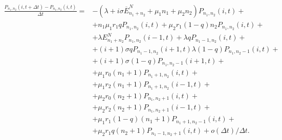 \begin{equation*}
	\begin{split}
\frac{P_{n_{1}, n_{2}}(i,t+\Delta t) - P_{n_{1}, n_{2}}(i, t)}{\Delta t}=&-(\lambda+i\sigma \overline{E}_{n_{1}+n_{2}}^N+\mu_{1}n_{1}+\mu_{2}n_{2})P_{n_{1}, n_{2}}(i,t)+\\
&+ n_{1}\mu_{1}r_{1}qP_{n_{1}, n_{2}}(i,t)+ \mu_{2}r_{1}(1-q)n_{2}P_{n_{1}, n_{2}}(i,t)+\\
&+ \lambda E_{n_{1}+n_{2}}^N P_{n_{1}, n_{2}}(i-1,t)+\lambda qP_{n_{1}-1, n_{2}}(i,t)+\\
&+ (i+1) \sigma q P_{n_{1}-1, n_{2}}(i+1,t)\lambda (1-q)P_{n_{1}, n_{2}-1}(i,t) +\\
&+ (i+1) \sigma (1-q) P_{n_{1}, n_{2}-1}(i+1,t)+\\
&+ \mu_{1} r_{0}(n_{1}+1) P_{n_{1} +1 , n_{2}}(i,t)+\\
& + \mu_{1} r_{2} (n_{1}+1) P_{n_{1} + 1, n_{2}}(i-1,t)+\\
&+ \mu_{2} r_{0}(n_{2}+1) P_{n_{1}, n_{2} + 1 }(i,t)+\\
&+\mu_{2} r_{2} (n_{2}+1) P_{n_{1}, n_{2} + 1}(i-1,t)+\\
&+\mu_{1} r_{1}(1-q)(n_{1}+1) P_{n_{1} +1 , n_{2}-1}(i,t)+\\
&+\mu_{2} r_{1}q (n_{2}+1)P_{n_{1} -1 , n_{2}+1}(i,t)+ o(\Delta t)/\Delta t.
\end{split}
\end{equation*}

